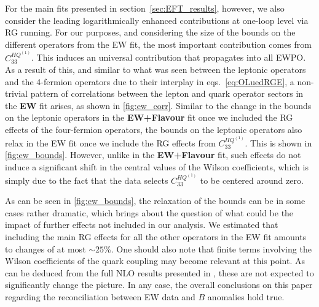 For the main fits presented in section~\ref{sec:EFT_results}, however, we also consider the leading logarithmically enhanced contributions at one-loop level via RG running. For our purposes, and considering the size of the bounds on the different operators from the EW fit, the most important contribution comes from $C^{HQ^{(1)}}_{33}$. This induces an universal contribution that propagates into all EWPO. As a result of this, and similar to what was seen between the leptonic operators and the 4-fermion operators due to their interplay in eqs.~\eqref{eq:OLuedRGE}, a non-trivial pattern of correlations between the lepton and quark operator sectors in the {\bf EW} fit arises, as shown in \autoref{fig:ew_corr}. Similar to the change in the bounds on the leptonic operators in the {\bf EW+Flavour} fit once we included the RG effects of the four-fermion operators, the bounds on the leptonic operators also relax in the EW fit once we include the RG effects from $C^{HQ^{(1)}}_{33}$. This is shown in \autoref{fig:ew_bounds}. However, unlike in the {\bf EW+Flavour} fit, such effects do not induce a significant shift in the central values of the Wilson coefficients, which is simply due to the fact that the data selects $C^{HQ^{(1)}}_{33}$ to be centered around zero. 

As can be seen in \autoref{fig:ew_bounds}, the relaxation of the bounds can be in some cases rather dramatic, which brings about the question of what could be the impact of further effects not included in our analysis. We estimated that including the main RG effects for all the other operators in the EW fit amounts to changes of at most $\sim 25\%$. One should also note that finite terms involving the Wilson coefficients of the quark coupling may become relevant at this point. As can be deduced from the full NLO results presented in \cite{Dawson:2019clf}, these are not expected to significantly change the picture. In any case, the overall conclusions on this paper regarding the reconciliation between EW data and $B$ anomalies hold true.